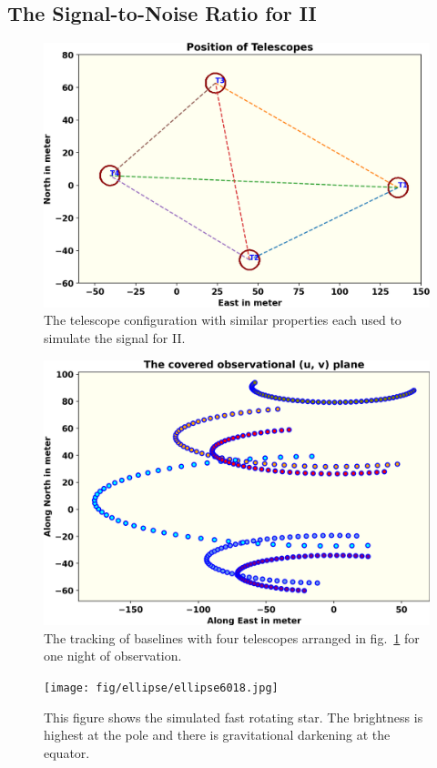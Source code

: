 \documentclass[fleqn,usenatbib,twocolumn]{mnras}
\begin{document}
\subsection{The Signal-to-Noise Ratio for II}
\begin{figure}
	\centering
	\includegraphics[width=\linewidth]{fig/telescope.png}
	\caption{The telescope configuration with similar properties each used to simulate the signal for II.}
	\label{fig:teles}
\end{figure}
\begin{figure}
	\centering
	\includegraphics[width=\linewidth]{fig/baseline.png}
	\caption{The tracking of baselines with four telescopes arranged in fig.~\ref{fig:teles} for one night of observation.}
	\label{fig:base}
\end{figure}
\begin{figure}
	\centering
	\texttt{[image: fig/ellipse/ellipse6018.jpg]}
	\caption{This figure shows the simulated fast rotating star. The brightness is highest at the pole and there is gravitational darkening at the equator.}
	\label{fig:image}
\end{figure}
\end{document}
